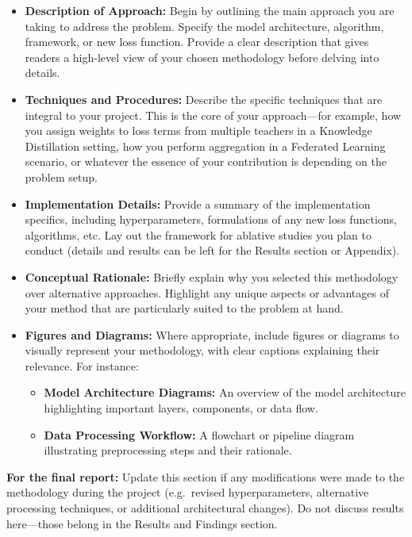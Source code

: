 \documentclass{article}
\begin{document}
\begin{itemize}
    \item \textbf{Description of Approach:} Begin by outlining the main approach you are taking to address the problem. Specify the model architecture, algorithm, framework, or new loss function. Provide a clear description that gives readers a high-level view of your chosen methodology before delving into details.

    \item \textbf{Techniques and Procedures:} Describe the specific techniques that are integral to your project. This is the core of your approach---for example, how you assign weights to loss terms from multiple teachers in a Knowledge Distillation setting, how you perform aggregation in a Federated Learning scenario, or whatever the essence of your contribution is depending on the problem setup.

    \item \textbf{Implementation Details:} Provide a summary of the implementation specifics, including hyperparameters, formulations of any new loss functions, algorithms, etc. Lay out the framework for ablative studies you plan to conduct (details and results can be left for the Results section or Appendix).

    \item \textbf{Conceptual Rationale:} Briefly explain why you selected this methodology over alternative approaches. Highlight any unique aspects or advantages of your method that are particularly suited to the problem at hand.

    \item \textbf{Figures and Diagrams:} Where appropriate, include figures or diagrams to visually represent your methodology, with clear captions explaining their relevance. For instance:
    \begin{itemize}
        \item \textbf{Model Architecture Diagrams:} An overview of the model architecture highlighting important layers, components, or data flow.
        \item \textbf{Data Processing Workflow:} A flowchart or pipeline diagram illustrating preprocessing steps and their rationale.
    \end{itemize}
\end{itemize}

\textbf{For the final report:} Update this section if any modifications were made to the methodology during the project (e.g.\ revised hyperparameters, alternative processing techniques, or additional architectural changes). Do not discuss results here---those belong in the Results and Findings section.
\end{document}

